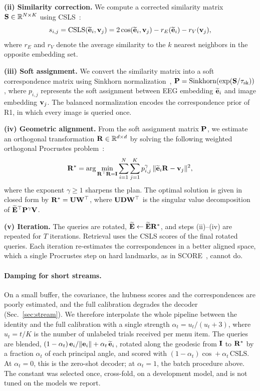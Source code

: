 \documentclass[10pt,twocolumn,letterpaper]{article}
\begin{document}
\textbf{(ii) Similarity correction.}
We compute a corrected similarity matrix ${\bf S} \in {\mathbb R}^{N\times K}$ using CSLS~\cite{conneau2018muse}:
\begin{equation}
s_{i,j} = \mathrm{CSLS}(\widetilde{{\bf e}}_i,{\bf v}_j) = 2\cos(\widetilde{{\bf e}}_i,{\bf v}_j) - r_E(\widetilde{{\bf e}}_i) - r_V({\bf v}_j),
\end{equation}
where $r_E$ and $r_V$ denote the average similarity to the $k$ nearest neighbors in the opposite embedding set.

\textbf{(iii) Soft assignment.}
We convert the similarity matrix into a soft correspondence matrix using Sinkhorn normalization~\cite{sinkhorn1964,cuturi2013sinkhorn}, ${\bf P} = \mathrm{Sinkhorn}(\exp({\bf S}/\tau_{\mathrm{sk}}))$, where $p_{i,j}$ represents the soft assignment between EEG embedding $\widetilde{{\bf e}}_i$ and image embedding ${\bf v}_j$. The balanced normalization encodes the correspondence prior of R1, in which every image is queried once.

\textbf{(iv) Geometric alignment.}
From the soft assignment matrix ${\bf P}$, we estimate an orthogonal transformation ${\bf R} \in {\mathbb R}^{d\times d}$ by solving the following weighted orthogonal Procrustes problem~\cite{schonemann1966procrustes}:
\begin{equation}
{\bf R}^* = {\hbox{\rm arg}}\min_{{\bf R}^\top {\bf R} = {\bf I}} \sum_{i=1}^{N}\sum_{j=1}^{K} p_{i,j}^{\gamma}\,\|\widetilde{{\bf e}}_i{\bf R} - {\bf v}_j\|^2,
\end{equation}
where the exponent $\gamma \geq 1$ sharpens the plan. The optimal solution is given in closed form by ${\bf R}^* = {\bf U} {\bf W}^\top$, where ${\bf U} {\bf D} {\bf W}^\top$ is the singular value decomposition of $\widetilde{{\bf E}}^\top {\bf P}^{\gamma} {\bf V}$.

\textbf{(v) Iteration.}
The queries are rotated, $\widetilde{{\bf E}} \leftarrow \widetilde{{\bf E}}{\bf R}^*$, and steps (ii)--(iv) are repeated for $T$ iterations. Retrieval uses the CSLS scores of the final rotated queries. Each iteration re-estimates the correspondences in a better aligned space, which a single Procrustes step on hard landmarks, as in SCORE~\cite{cui2026score}, cannot do.

\paragraph{Damping for short streams.}
On a small buffer, the covariance, the hubness scores and the correspondences are poorly estimated, and the full calibration degrades the decoder (Sec.~\ref{sec:stream}). We therefore interpolate the whole pipeline between the identity and the full calibration with a single strength $\alpha_t = u_t/(u_t + 3)$, where $u_t = t/K$ is the number of unlabeled trials received per menu item. The queries are blended, $(1-\alpha_t)\,{\bf e}_i/\|{\bf e}_i\| + \alpha_t\, \widetilde{{\bf e}}_i$, rotated along the geodesic from ${\bf I}$ to ${\bf R}^*$ by a fraction $\alpha_t$ of each principal angle, and scored with $(1-\alpha_t)\cos + \alpha_t\,\mathrm{CSLS}$. At $\alpha_t=0$, this is the zero-shot decoder; at $\alpha_t=1$, the batch procedure above. The constant was selected once, cross-fold, on a development model, and is not tuned on the models we report.
\end{document}
